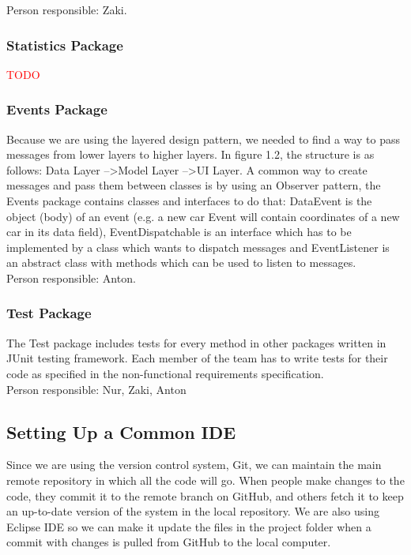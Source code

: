 \documentclass{article}
\begin{document}
\noindent
Person responsible: Zaki.

\subsubsection{Statistics Package}
\textcolor{red}{TODO}

\subsubsection{Events Package}
Because we are using the layered design pattern, we needed to find a way to pass messages from lower layers to higher layers. In figure 1.2, the structure is as follows: Data Layer --\textgreater Model Layer --\textgreater UI Layer. 
A common way to create messages and pass them between classes is by using an Observer pattern, the Events package contains classes and interfaces to do that: DataEvent is the object (body) of an event (e.g. a new car Event will contain coordinates of a new car in its data field), EventDispatchable is an interface which has to be implemented by a class which wants to dispatch messages and EventListener is an abstract class with methods which can be used to listen to messages.\\

\noindent
Person responsible: Anton.

\subsubsection{Test Package}
The Test package includes tests for every method in other packages written in JUnit testing framework. 
Each member of the team has to write  tests for their code as specified in the non-functional requirements specification.\\

\noindent
Person responsible: Nur, Zaki, Anton

\subsection{Setting Up a Common IDE}

Since we are using the version control system, Git, we can maintain the main remote repository in which all the code will go. 
When people make changes to the code, they commit it to the remote branch on GitHub, and others fetch it to keep an up-to-date version of the system in the local repository. 
We are also using Eclipse IDE so we can make it update the files in the project folder when a commit with changes is pulled from GitHub to the local computer.\\
\end{document}
